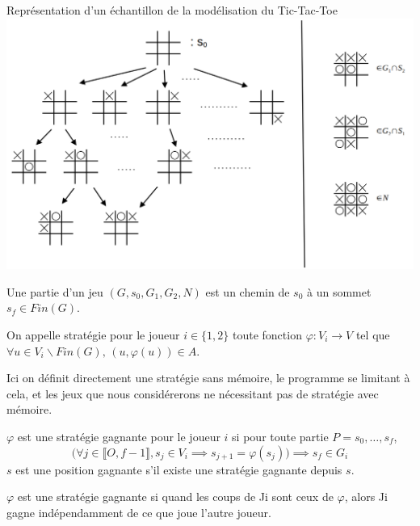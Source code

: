 \begin{example}
	Représentation d'un échantillon de la modélisation du Tic-Tac-Toe\\
	\includegraphics[width=\linewidth]{lecon/16-jeu/tic-tac-toe.png}
\end{example}

\begin{definition}[Partie]
	Une partie d'un jeu $(G, s_0, G_1, G_2, N)$ est un chemin de $s_0$ à un sommet $s_f \in Fin(G)$.
\end{definition}

\begin{definition}
	On appelle stratégie pour le joueur $i \in \{1, 2\}$ toute fonction $\varphi : V_i \to V$ tel que $\forall u \in V_i \backslash Fin(G), \, (u, \varphi(u)) \in A$.
\end{definition}

\begin{com}
	Ici on définit directement une stratégie sans mémoire, le programme se limitant à cela, et les jeux que nous considérerons ne nécessitant pas de stratégie avec mémoire.
\end{com}

\begin{definition}
	$\varphi$ est une stratégie gagnante pour le joueur $i$ si pour toute partie $P = s_0, \dots, s_f$,
	$$ \Big( \forall j \in \llbracket O, f-1 \rrbracket, s_j \in V_i \implies s_{j+1} = \varphi(s_j) \Big) \implies s_f \in G_i$$
	$s$ est une position gagnante s'il existe une stratégie gagnante depuis $s$.
\end{definition}

\begin{idee}
	$\varphi$ est une stratégie gagnante si quand les coups de Ji sont ceux de $\varphi$, alors Ji gagne indépendamment de ce que joue l'autre joueur. 
\end{idee}

